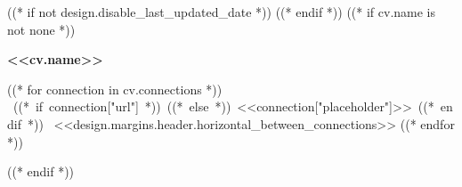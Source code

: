 ((* if not design.disable_last_updated_date *))
\placelastupdatedtext
((* endif *))
((* if cv.name is not none *))
\begin{header}
    \textbf{\fontsize{<<design.header_font_size>>}{<<design.header_font_size>>}\selectfont <<cv.name>>}

    \vspace{<<design.margins.header.vertical_between_name_and_connections>>}

    \normalsize
    ((* for connection in cv.connections *))
    \mbox{
        ((* if connection["url"] *))
        ((* else *))
        {\color{black}{\footnotesize<<connection["latex_icon"]>>}\hspace*{0.13cm}<<connection["placeholder"]>>}
        ((* endif *))
    }
    \kern <<design.margins.header.horizontal_between_connections>>
    ((* endfor *))
\end{header}

\vspace{<<design.margins.header.bottom>> - <<design.margins.section_title.top>>}
((* endif *))